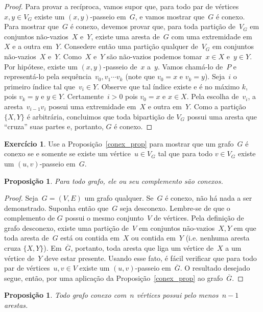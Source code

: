 \documentclass[12pt, a4paper]{article}
\newtheorem{prop}[teor]{Proposição}
\theoremstyle{definition}
\newtheorem{exer}{Exercício}
\begin{document}
\begin{proof}
  Para provar a recíproca, vamos supor que, para todo par de
  vértices~$x,y \in V_G$ existe um $(x,y)$-passeio em~$G$, e vamos
  mostrar que~$G$ é conexo. Para mostrar que~$G$ é conexo, devemos
  provar que, para toda partição de~$V_G$ em conjuntos não-vazios~$X$ e~$Y$, existe uma aresta de~$G$ com uma extremidade em~$X$ e a outra em~$Y$. Consedere então uma partição qualquer de~$V_G$ em conjuntos
  não-vazios~$X$ e~$Y$. Como~$X$ e~$Y$ são não-vazios podemos tomar~$x
  \in X$ e~$y \in Y$.  Por hipótese, existe um $(x,y)$-passeio de~$x$
  a~$y$. Vamos chamá-lo de~$P$ e representá-lo pela sequência~$v_0, v_1 \cdots v_k$ (note que $v_0 = x$ e $v_k = y$). Seja~$i$ o primeiro índice tal que~$v_i
  \in Y$. Observe que tal índice existe e é no máximo $k$, pois $v_k = y$ e $y \in Y$. Certamente~$i > 0$ pois $v_0 = x$ e $x \in X$. Pela escolha de~$v_i$, a aresta~$v_{i-1}v_{i}$ possui uma extremidade em~$X$ e outra em~$Y$. Como a partição~$\{X,Y\}$ é arbitrária, concluimos que toda bipartição de $V_G$ possui uma aresta que ``cruza'' suas partes e, portanto, $G$ é conexo.
\end{proof}

\begin{exer}
Use a Proposição~\ref{conex_prop} para mostrar que um grafo~$G$ é conexo se e somente se existe um vértice~$u \in V_G$ tal que para todo $v \in V_G$ existe um $(u,v)$-passeio em~$G$.
\end{exer}

\begin{prop}
  Para todo grafo, ele ou seu complemento são conexos.
\end{prop}

\begin{proof} 
Seja~$G = (V,E)$ um grafo qualquer. Se~$G$ é conexo, não há nada a ser demonstrado. Suponha então que~$G$ seja desconexo. Lembre-se de que o complemento de $G$ possui o mesmo conjunto~$V$ de vértices. Pela definição de grafo desconexo, existe uma partição de~$V$ em conjuntos não-vazios~$X,Y$ em que toda aresta de~$G$ está ou contida em~$X$ ou contida em~$Y$ (i.e. nenhuma aresta cruza $\{X, Y\}$). Em~$\overline{G}$, portanto, toda aresta que liga um vértice de~$X$ a um vértice de~$Y$ deve estar presente. Usando esse fato, é fácil verificar que para todo par de vértices~$u,v \in V$ existe um $(u,v)$-passeio em~$\overline{G}$. O resultado desejado segue, então, por uma aplicação da Proposição~\ref{conex_prop} ao grafo~$\overline{G}$.
\end{proof}


\begin{prop}
  Todo grafo conexo com~$n$ vértices possui pelo menos~$n-1$ arestas.
\end{prop}
\end{document}
